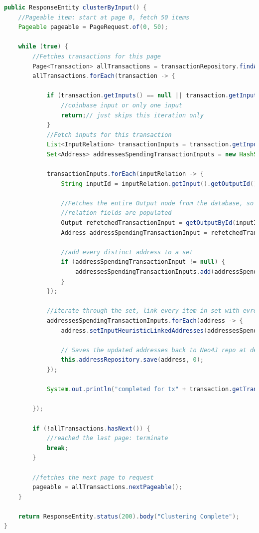 \begin{lstlisting}[caption={Java Implementation using Paging}, label={lst:clustering-java}, language=Java, breaklines=true, basicstyle=\small]
public ResponseEntity clusterByInput() {
    //Pageable item: start at page 0, fetch 50 items
    Pageable pageable = PageRequest.of(0, 50);

    while (true) {
        //Fetches transactions for this page
        Page<Transaction> allTransactions = transactionRepository.findAll(pageable);
        allTransactions.forEach(transaction -> {
            
            if (transaction.getInputs() == null || transaction.getInputs().size() < 2) {
                //coinbase input or only one input
                return;// just skips this iteration only
            }
            //Fetch inputs for this transaction
            List<InputRelation> transactionInputs = transaction.getInputs();
            Set<Address> addressesSpendingTransactionInputs = new HashSet<>();

            transactionInputs.forEach(inputRelation -> {
                String inputId = inputRelation.getInput().getOutputId();
                
                //Fetches the entire Output node from the database, so it's
                //relation fields are populated
                Output refetchedTransactionInput = getOutputById(inputId);
                Address addressSpendingTransactionInput = refetchedTransactionInput.getLockedToAddress();
                
                //add every distinct address to a set
                if (addressSpendingTransactionInput != null) {
                    addressesSpendingTransactionInputs.add(addressSpendingTransactionInput);
                }
            });

            //iterate through the set, link every item in set with evrey other
            addressesSpendingTransactionInputs.forEach(address -> {
                address.setInputHeuristicLinkedAddresses(addressesSpendingTransactionInputs);
                
                // Saves the updated addresses back to Neo4J repo at depth 0
                this.addressRepository.save(address, 0);
            });

            System.out.println("completed for tx" + transaction.getTransactionId());

        });

        if (!allTransactions.hasNext()) {
            //reached the last page: terminate
            break;
        }
        
        //fetches the next page to request
        pageable = allTransactions.nextPageable();
    }

    return ResponseEntity.status(200).body("Clustering Complete");
}
\end{lstlisting}

